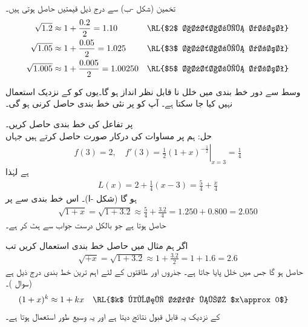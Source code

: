 تخمین  (شکل -ب) سے درج ذیل قیمتیں حاصل ہوتی ہیں۔
\begin{align*}
\sqrt{1.2}&\approx 1+\frac{0.2}{2}=1.10&& \text{\RL{$2$ اعشاریہ درست}}\\
\sqrt{1.05}&\approx 1+\frac{0.05}{2}=1.025&& \text{\RL{$3$ اعشاریہ درست}}\\
\sqrt{1.005}&\approx 1+\frac{0.005}{2}=1.00250&& \text{\RL{$5$ اعشاریہ درست}}\\
\end{align*}

وسط سے دور خط بندی میں خلل نا قابل نظر انداز ہو گا۔یوں  کو  کے نزدیک استعمال نہیں کیا جا سکتا ہے۔ آپ کو  پر نئی خط بندی حاصل کرنی ہو گی۔

 پر تفاعل  کی خط بندی حاصل کریں۔ \\
حل:\quad
ہم  پر مساوات  کی درکار صورت حاصل کرتے ہیں جہاں
\begin{align*}
f(3)=2,\quad f'(3)=\left.\frac{1}{2}(1+x)^{-\tfrac{1}{2}}\right|_{x=3}=\frac{1}{4}
\end{align*}
ہے لہٰذا
\begin{align*}
L(x)=2+\frac{1}{4}(x-3)=\frac{5}{4}+\frac{x}{4}
\end{align*}
ہو گا (شکل -ا)۔ اس خط بندی سے  پر 
\begin{align*}
\sqrt{1+x}=\sqrt{1+3.2}\approx \frac{5}{4}+\frac{3.2}{4}=1.250+0.800=2.050
\end{align*}
حاصل ہوتا ہے جو بالکل درست جواب  سے  ہٹ کر ہے۔

اگر ہم مثال  میں حاصل خط بندی استعمال کریں تب 
\begin{align*}
\sqrt{+x}=\sqrt{1+3.2}\approx 1+\frac{3.2}{2}=1+1.6=2.6
\end{align*}
حاصل ہو گا جس میں  خلل پایا جاتا ہے۔
جذروں اور طاقتوں کے لئے اہم ترین خط بندی درج ذیل ہے (سوال )۔
\begin{align}\label{مساوات_استعمال_طاقت_خطی_تخمین}
(1+x)^k&\approx 1+kx&&\text{\RL{$k$ کوئی عدد ہے؛ $x\approx 0$}}
\end{align}
 کے نزدیک یہ قابل قبول نتائج دیتا ہے اور یہ وسیع طور استعمال ہوتا ہے۔


